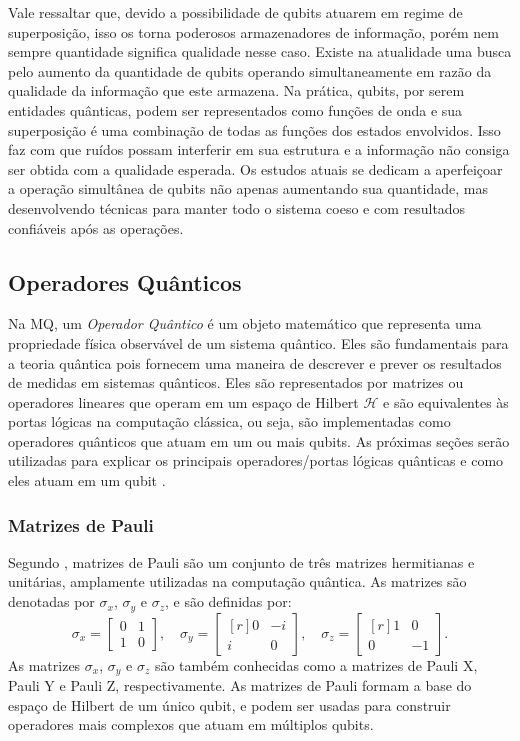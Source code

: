 Vale ressaltar que, devido a possibilidade de qubits atuarem em regime de superposição, isso os torna poderosos armazenadores de informação, porém nem sempre quantidade significa qualidade nesse caso. Existe na atualidade uma busca pelo aumento da quantidade de qubits operando simultaneamente em razão da qualidade da informação que este armazena. Na prática, qubits, por serem entidades quânticas, podem ser representados como funções de onda e sua superposição é uma combinação de todas as funções dos estados envolvidos. Isso faz com que ruídos possam interferir em sua estrutura e a informação não consiga ser obtida com a qualidade esperada. Os estudos atuais se dedicam a aperfeiçoar a operação simultânea de qubits não apenas aumentando sua quantidade, mas desenvolvendo técnicas para manter todo o sistema coeso e com resultados confiáveis após as operações.

\subsection{Operadores Quânticos}\label{sec:opquantico}

Na MQ, um \textit{Operador Quântico} é um objeto matemático que representa uma propriedade física observável de um sistema quântico. Eles são fundamentais para a teoria quântica pois fornecem uma maneira de descrever e prever os resultados de medidas em sistemas quânticos. Eles são representados por matrizes ou operadores lineares que operam em um espaço de Hilbert \(\mathcal{H}\) e são equivalentes às portas lógicas na computação clássica, ou seja, são implementadas como operadores quânticos que atuam em um ou mais qubits. As próximas seções serão utilizadas para explicar os principais operadores/portas lógicas quânticas e como eles atuam em um qubit \cite{jorcuvich}.

\subsubsection{Matrizes de Pauli}\label{sec:pauli}

Segundo \textcite{chuang}, matrizes de Pauli são um conjunto de três matrizes hermitianas e unitárias, amplamente utilizadas na computação quântica. As matrizes são denotadas por $\sigma_x$, $\sigma_y$ e $\sigma_z$, e são definidas por:
\begin{equation}
\sigma_x=\begin{bmatrix}
0 & 1 \\
1 & 0
\end{bmatrix}, \quad \sigma_y=\begin{bmatrix*}[r]
0 & -i \\
i & 0
\end{bmatrix*}, \quad \sigma_z=\begin{bmatrix*}[r]
1 & 0 \\
0 & -1
\end{bmatrix*}.
\end{equation}
As matrizes $\sigma_x$, \(\sigma_{y}\) e \(\sigma_{z}\) são também conhecidas como a matrizes de Pauli X, Pauli Y e Pauli Z, respectivamente. As matrizes de Pauli formam a base do espaço de Hilbert de um único qubit, e podem ser usadas para construir operadores mais complexos que atuam em múltiplos qubits.

